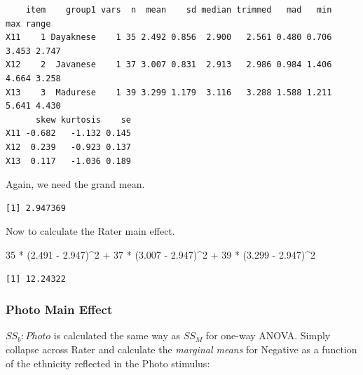 \documentclass[
  11pt,
]{book}
\newenvironment{Shaded}{\begin{snugshade}}{\end{snugshade}}
\newcommand{\DecValTok}[1]{\textcolor[rgb]{0.00,0.00,0.81}{#1}}
\newcommand{\FloatTok}[1]{\textcolor[rgb]{0.00,0.00,0.81}{#1}}
\newcommand{\FunctionTok}[1]{\textcolor[rgb]{0.00,0.00,0.00}{#1}}
\newcommand{\NormalTok}[1]{#1}
\newcommand{\SpecialCharTok}[1]{\textcolor[rgb]{0.00,0.00,0.00}{#1}}
\begin{document}
\begin{verbatim}
    item    group1 vars  n  mean    sd median trimmed   mad   min   max range
X11    1 Dayaknese    1 35 2.492 0.856  2.900   2.561 0.480 0.706 3.453 2.747
X12    2  Javanese    1 37 3.007 0.831  2.913   2.986 0.984 1.406 4.664 3.258
X13    3  Madurese    1 39 3.299 1.179  3.116   3.288 1.588 1.211 5.641 4.430
      skew kurtosis    se
X11 -0.682   -1.132 0.145
X12  0.239   -0.923 0.137
X13  0.117   -1.036 0.189
\end{verbatim}

Again, we need the grand mean.

\begin{Shaded}
\end{Shaded}

\begin{verbatim}
[1] 2.947369
\end{verbatim}

Now to calculate the Rater main effect.

\begin{Shaded}
\begin{Highlighting}[]
\DecValTok{35} \SpecialCharTok{*}\NormalTok{ (}\FloatTok{2.491} \SpecialCharTok{{-}} \FloatTok{2.947}\NormalTok{)}\SpecialCharTok{\^{}}\DecValTok{2} \SpecialCharTok{+} \DecValTok{37} \SpecialCharTok{*}\NormalTok{ (}\FloatTok{3.007} \SpecialCharTok{{-}} \FloatTok{2.947}\NormalTok{)}\SpecialCharTok{\^{}}\DecValTok{2} \SpecialCharTok{+} \DecValTok{39} \SpecialCharTok{*}\NormalTok{ (}\FloatTok{3.299} \SpecialCharTok{{-}} \FloatTok{2.947}\NormalTok{)}\SpecialCharTok{\^{}}\DecValTok{2}
\end{Highlighting}
\end{Shaded}

\begin{verbatim}
[1] 12.24322
\end{verbatim}

\hypertarget{photo-main-effect}{%
\subsubsection{Photo Main Effect}\label{photo-main-effect}}

\(SS_b:Photo\) is calculated the same way as \(SS_M\) for one-way ANOVA. Simply collapse across Rater and calculate the \emph{marginal means} for Negative as a function of the ethnicity reflected in the Photo stimulus:
\end{document}
